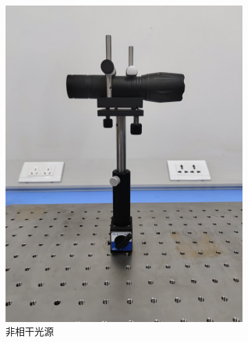 \documentclass[a4paper]{report} %
\begin{document}
\begin{figure}[H]
\begin{subfigure}{0.22\textwidth}
        \includegraphics[width=\linewidth]{非相干光源.jpg}
        \caption{非相干光源}
    \end{subfigure}
    \begin{subfigure}{0.22\textwidth}

\end{subfigure}
\end{figure}
\end{document}

